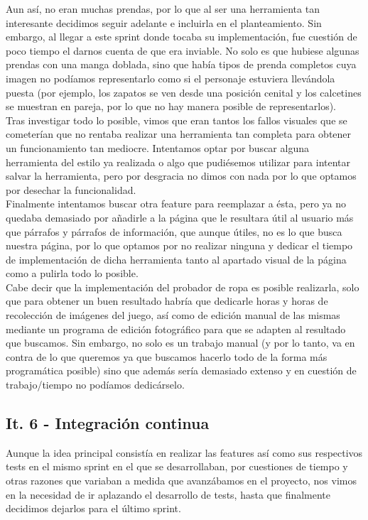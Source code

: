 Aun así, no eran muchas prendas, por lo que al ser una herramienta tan interesante decidimos seguir adelante e incluirla en el planteamiento. Sin embargo, al llegar a este sprint donde tocaba su implementación, fue cuestión de poco tiempo el darnos cuenta de que era inviable. No solo es que hubiese algunas prendas con una manga doblada, sino que había tipos de prenda completos cuya imagen no podíamos representarlo como si el personaje estuviera llevándola puesta (por ejemplo, los zapatos se ven desde una posición cenital y los calcetines se muestran en pareja, por lo que no hay manera posible de representarlos).\\

Tras investigar todo lo posible, vimos que eran tantos los fallos visuales que se cometerían que no rentaba realizar una herramienta tan completa para obtener un funcionamiento tan mediocre. Intentamos optar por buscar alguna herramienta del estilo ya realizada o algo que pudiésemos utilizar para intentar salvar la herramienta, pero por desgracia no dimos con nada por lo que optamos por desechar la funcionalidad.\\

Finalmente intentamos buscar otra feature para reemplazar a ésta, pero ya no quedaba demasiado por añadirle a la página que le resultara útil al usuario más que párrafos y párrafos de información, que aunque útiles, no es lo que busca nuestra página, por lo que optamos por no realizar ninguna y dedicar el tiempo de implementación de dicha herramienta tanto al apartado visual de la página como a pulirla todo lo posible.\\

Cabe decir que la implementación del probador de ropa es posible realizarla, solo que para obtener un buen resultado habría que dedicarle horas y horas de recolección de imágenes del juego, así como de edición manual de las mismas mediante un programa de edición fotográfico para que se adapten al resultado que buscamos. Sin embargo, no solo es un trabajo manual (y por lo tanto, va en contra de lo que queremos ya que buscamos hacerlo todo de la forma más programática posible) sino que además sería demasiado extenso y en cuestión de trabajo/tiempo no podíamos dedicárselo.

\subsection{It. 6 - Integración continua}

Aunque la idea principal consistía en realizar las features así como sus respectivos tests en el mismo sprint en el que se desarrollaban, por cuestiones de tiempo y otras razones que variaban a medida que avanzábamos en el proyecto, nos vimos en la necesidad de ir aplazando el desarrollo de tests, hasta que finalmente decidimos dejarlos para el último sprint.\\

